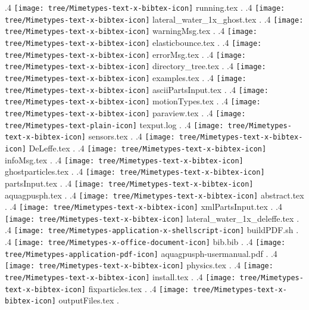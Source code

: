 {.4 { \texttt{[image: tree/Mimetypes-text-x-bibtex-icon]} running.tex }.
.4 { \texttt{[image: tree/Mimetypes-text-x-bibtex-icon]} lateral\_water\_1x\_ghost.tex }.
.4 { \texttt{[image: tree/Mimetypes-text-x-bibtex-icon]} warningMsg.tex }.
.4 { \texttt{[image: tree/Mimetypes-text-x-bibtex-icon]} elasticbounce.tex }.
.4 { \texttt{[image: tree/Mimetypes-text-x-bibtex-icon]} errorMsg.tex }.
.4 { \texttt{[image: tree/Mimetypes-text-x-bibtex-icon]} directory\_tree.tex }.
.4 { \texttt{[image: tree/Mimetypes-text-x-bibtex-icon]} examples.tex }.
.4 { \texttt{[image: tree/Mimetypes-text-x-bibtex-icon]} asciiPartsInput.tex }.
.4 { \texttt{[image: tree/Mimetypes-text-x-bibtex-icon]} motionTypes.tex }.
.4 { \texttt{[image: tree/Mimetypes-text-x-bibtex-icon]} paraview.tex }.
.4 { \texttt{[image: tree/Mimetypes-text-plain-icon]} texput.log }.
.4 { \texttt{[image: tree/Mimetypes-text-x-bibtex-icon]} sensors.tex }.
.4 { \texttt{[image: tree/Mimetypes-text-x-bibtex-icon]} DeLeffe.tex }.
.4 { \texttt{[image: tree/Mimetypes-text-x-bibtex-icon]} infoMsg.tex }.
.4 { \texttt{[image: tree/Mimetypes-text-x-bibtex-icon]} ghostparticles.tex }.
.4 { \texttt{[image: tree/Mimetypes-text-x-bibtex-icon]} partsInput.tex }.
.4 { \texttt{[image: tree/Mimetypes-text-x-bibtex-icon]} aquagpusph.tex }.
.4 { \texttt{[image: tree/Mimetypes-text-x-bibtex-icon]} abstract.tex }.
.4 { \texttt{[image: tree/Mimetypes-text-x-bibtex-icon]} xmlPartsInput.tex }.
.4 { \texttt{[image: tree/Mimetypes-text-x-bibtex-icon]} lateral\_water\_1x\_deleffe.tex }.
.4 { \texttt{[image: tree/Mimetypes-application-x-shellscript-icon]} buildPDF.sh }.
.4 { \texttt{[image: tree/Mimetypes-x-office-document-icon]} bib.bib }.
.4 { \texttt{[image: tree/Mimetypes-application-pdf-icon]} aquagpusph-usermanual.pdf }.
.4 { \texttt{[image: tree/Mimetypes-text-x-bibtex-icon]} physics.tex }.
.4 { \texttt{[image: tree/Mimetypes-text-x-bibtex-icon]} install.tex }.
.4 { \texttt{[image: tree/Mimetypes-text-x-bibtex-icon]} fixparticles.tex }.
.4 { \texttt{[image: tree/Mimetypes-text-x-bibtex-icon]} outputFiles.tex }.
}
